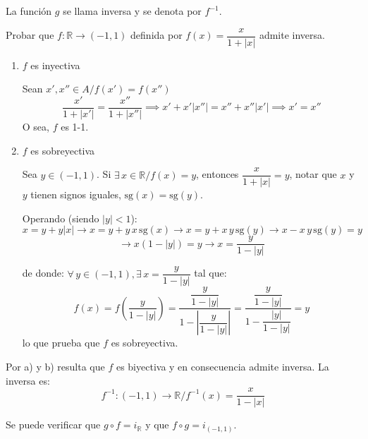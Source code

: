 La función $g$ se llama inversa y se denota por $f^{-1}$.

\begin{fmd-example}
	Probar que $f: \mathbb{R} \rightarrow (-1, 1)$ definida por 
	$f(x) = \dfrac{x}{1 + |x|}$ admite inversa.
	
	\begin{enumerate}[label=\textbf{\alph*)}]
		\item $f$ es inyectiva
		
		Sean $x', x'' \in A / f(x') = f(x'')$
		\[ \frac{x'}{1 + |x'|} = \frac{x''}{1 + |x''|} \implies x' + x'|x''| = 
		x'' + x'' |x'| \implies x' = x'' \]
		O sea, $f$ es 1-1.
		\item $f$ es sobreyectiva
		
		Sea $y \in (-1, 1)$. Si $\exists \, x \in \mathbb{R} / f(x) = y$, entonces 
		$\dfrac{x}{1 + |x|} = y$, notar que $x$ y $y$ tienen signos iguales, $\mathrm{sg}(x) = \mathrm{sg}(y)$.
		
		Operando (siendo $|y| < 1$):
		\[ x = y + y|x| \rightarrow x = y + y \, x \, \mathrm{sg}(x) \rightarrow
		x = y + x \, y \, \mathrm{sg}(y) \rightarrow x - x \, y \, \mathrm{sg}(y) = y \]
		\[ \rightarrow x(1 - |y|) = y \rightarrow x = \frac{y}{1 - |y|}\]
	
		de donde: $\forall \, y \in (-1, 1), \exists \, x = \dfrac{y}{1 - |y|}$ tal que:
		\[ f(x) = f \left( \frac{y}{1 - |y|} \right) = \frac{\dfrac{y}{1-|y|}}{1 - 
			\left| \dfrac{y}{1 - |y|} \right|} = \frac{\dfrac{y}{1 - |y|}}{1 - \dfrac{|y|}
			{1 - |y|}} = y \]
		lo que prueba que $f$ es sobreyectiva.
\end{enumerate}
	
	Por a) y b) resulta que $f$ es biyectiva y en consecuencia admite inversa. La 
	inversa es: \[ f^{-1}: (-1,1) \rightarrow \mathbb{R} / f^{-1}(x) = \dfrac{x}{1 - |x|}\]
	
	Se puede verificar que $g \circ f = i_\mathbb{R}$ y que $f \circ g = i_{(-1,1)}$.
\end{fmd-example}

